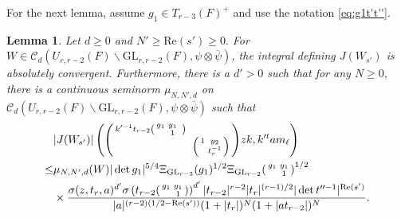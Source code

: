 \documentclass[12pt]{amsart}
\newtheorem{lem}[thm]{Lemma}
\theoremstyle{remark}
\numberwithin{equation}{section}
\newcommand{\GL}{\mathrm{GL}}
\theoremstyle{definition}
\newenvironment{psmatrix}
  {\left(\begin{smallmatrix}}
  {\end{smallmatrix}\right)}
\numberwithin{equation}{subsection}
\begin{document}
For the next lemma, assume $g_1\in T_{r-3}(F)^+$ and use the notation \eqref{eq:g1t't''}.
\begin{lem} \label{prop:Jd>0} 
    Let $d\ge 0$ and $N' \geq \mathrm{Re}(s') \geq 0.$ For $W\in \mathcal{C}_{d}(U_{r,r-2}(F) \backslash \GL_{r,r-2}(F),\psi \otimes \overline{\psi})$, the integral defining $J(W_{s'})$ is absolutely convergent. Furthermore, there is a $d'>0$ such that for any $N\ge 0,$ there is a continuous seminorm $\mu_{N,N',d}$ on $ \mathcal{C}_{d}(U_{r,r-2}(F) \backslash \GL_{r,r-2}(F),\psi \otimes \overline{\psi})$ such that
        \begin{align*}
    &|J(W_{s'})|\left(\begin{psmatrix}k'^{-1}t_{r-2}\begin{psmatrix} g_1 & y_1 & \\ & 1 \end{psmatrix} & \\ & &  \begin{psmatrix} 1  & y_2 \\ & t_r^{-1}\end{psmatrix}\end{psmatrix}zk, k'^tam_\ell\right)  \\
    \leq & \mu_{N,N',d}(W)|\det g_1|^{5/4}\Xi_{\GL_{r-3}}(g_1)^{1/2}\Xi_{\GL_{r-2}}\begin{psmatrix}
       g_1 &y_1 \\
          &1
    \end{psmatrix}^{1/2}\\
    &\times\frac{\sigma(z,t_r,a)^{d'}\sigma\left(t_{r-2}\begin{psmatrix}
        g_1 &y_1 \\
          & 1
    \end{psmatrix}\right)^{d'}|t_{r-2}|^{r-2}|t_r|^{(r-1)/2}|\det t''^{-1}|^{\mathrm{Re}(s')}}{|a|^{(r-2)(1/2-\mathrm{Re}(s'))}(1+|t_r|)^{N}(1+|at_{r-2}|)^N}.
\end{align*}   
\end{lem}
\end{document}
